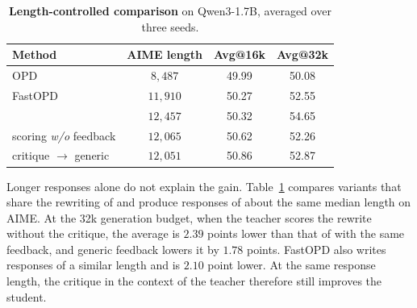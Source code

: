 \begin{table}[!t]
\centering
\caption{\textbf{Length-controlled comparison} on Qwen3-1.7B, averaged over
three seeds.}
\label{tab:length}
\footnotesize
\setlength{\tabcolsep}{4pt}
\begin{tabular}{@{}lccc@{}}
\toprule
\textbf{Method} & \textbf{AIME length} & \textbf{Avg@16k} & \textbf{Avg@32k} \\
\midrule
OPD & $8{,}487$ & 49.99 & 50.08 \\
FastOPD & $11{,}910$ & 50.27 & 52.55 \\
\midrule
\rowcolor{blue!8}
\ours{} & $12{,}457$ & 50.32 & 54.65 \\
\quad scoring \textit{w/o} feedback & $12{,}065$ & 50.62 & 52.26 \\
\quad critique $\rightarrow$ generic & $12{,}051$ & 50.86 & 52.87 \\
\bottomrule
\end{tabular}
\end{table}

Longer responses alone do not explain the gain.
Table~\ref{tab:length} compares variants that share the rewriting of \ours{} and
produce responses of about the same median length on AIME.
At the 32k generation budget, when the teacher scores the rewrite without the critique, the average is
$2.39$ points lower than that of \ours{} with the same feedback, and generic
feedback lowers it by $1.78$ points.
FastOPD also writes responses of a similar length and is $2.10$ point lower.
At the same response length, the critique in the context of the teacher
therefore still improves the student.
